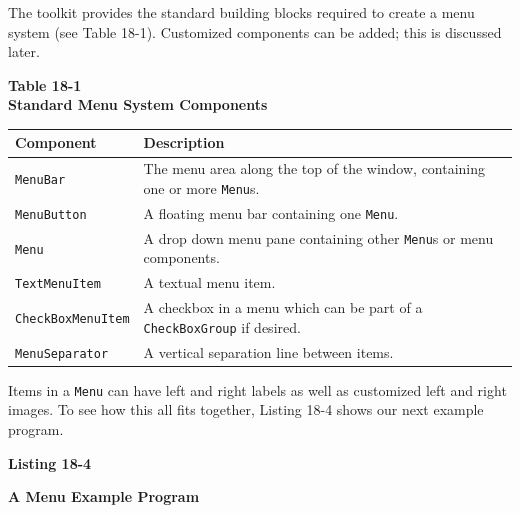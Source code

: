 The toolkit provides the standard building blocks required to create
a menu system (see Table 18-1). Customized components can
be added; this is discussed later.

\begin{center}
{\centering\sffamily\bfseries
Table 18-1 \\
Standard Menu System Components}
\end{center}
\begin{flushleft}
\begin{xtabular}{|m{1.6in}|m{4.3in}|}
\hline
\sffamily\bfseries Component &
\sffamily\bfseries Description\\\hline
\texttt{MenuBar} &
The menu area along the top of the window, containing one or
more \texttt{Menu}s.\\\hline
\texttt{MenuButton} &
A floating menu bar containing one \texttt{Menu}.\\\hline
\texttt{Menu} &
A drop down menu pane containing other \texttt{Menu}s or menu
components.\\\hline
\texttt{TextMenuItem} &
A textual menu item.\\\hline
\ttfamily \texttt{CheckBoxMenuItem}  &
A checkbox in a menu which can be part of a \texttt{CheckBoxGroup} if
desired.\\\hline
\texttt{MenuSeparator} &
A vertical separation line between items.\\\hline
\end{xtabular}
\end{flushleft}
Items in a \texttt{Menu} can have left and right labels as well as
customized left and right images. To see how this all fits together,
Listing 18-4 shows our next example program.

\bigskip

{\sffamily\bfseries
Listing 18-4}

{\sffamily\bfseries
A Menu Example Program}

